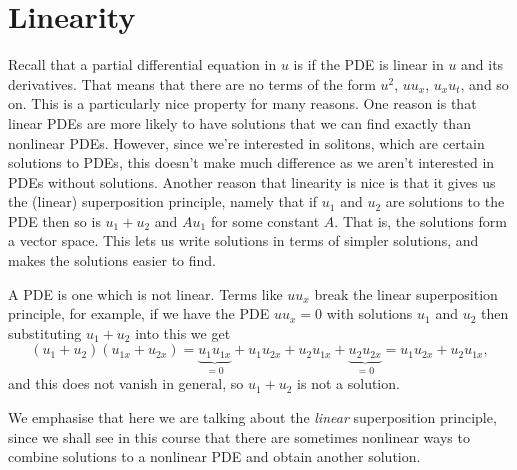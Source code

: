 \documentclass[fleqn]{NotesClass}
\begin{document}
    \section{Linearity}
    Recall that a partial differential equation in \(u\) is  if the PDE is linear in \(u\) and its derivatives.
    That means that there are no terms of the form \(u^2\), \(uu_x\), \(u_xu_t\), and so on.
    This is a particularly nice property for many reasons.
    One reason is that linear PDEs are more likely to have solutions that we can find exactly than nonlinear PDEs.
    However, since we're interested in solitons, which are certain solutions to PDEs, this doesn't make much difference as we aren't interested in PDEs without solutions.
    Another reason that linearity is nice is that it gives us the (linear) superposition principle, namely that if \(u_1\) and \(u_2\) are solutions to the PDE then so is \(u_1 + u_2\) and \(A u_1\) for some constant \(A\).
    That is, the solutions form a vector space.
    This lets us write solutions in terms of simpler solutions, and makes the solutions easier to find.
    
    A  PDE is one which is not linear.
    Terms like \(uu_x\) break the linear superposition principle, for example, if we have the PDE \(uu_x = 0\) with solutions \(u_1\) and \(u_2\) then substituting \(u_1 + u_2\) into this we get
    \begin{equation}
        (u_1 + u_2) (u_{1x} + u_{2x}) = \underbrace{u_1u_{1x}}_{=0} + u_1u_{2x} + u_2u_{1x} + \underbrace{u_2u_{2x}}_{=0} = u_1u_{2x} + u_2u_{1x},
    \end{equation}
    and this does not vanish in general, so \(u_1 + u_2\) is not a solution.
    
    We emphasise that here we are talking about the \emph{linear} superposition principle, since we shall see in this course that there are sometimes nonlinear ways to combine solutions to a nonlinear PDE and obtain another solution.
    
\end{document}
